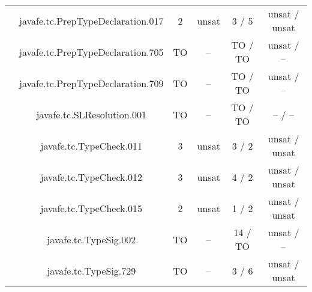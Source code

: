 \begin{table}[htbp]
\begin{minipage}{0.60\textwidth}
{\begin{tabular}[c]{c c!{\vrule width 1.5pt}c|c!{\vrule width 1.5pt}c|c|}
 			& javafe.tc.PrepTypeDeclaration.017	   		     & 2    & unsat   & 3   / 5        & unsat / unsat     \\
		 	& javafe.tc.PrepTypeDeclaration.705    			     & TO   & --      & TO  / TO       & unsat / --        \\
		 	& javafe.tc.PrepTypeDeclaration.709    			     & TO   & --      & TO  / TO       & unsat / --        \\
 			& javafe.tc.SLResolution.001		   		     & TO   & --      & TO  / TO       & --    / --        \\
 			& javafe.tc.TypeCheck.011		   		     & 3    & unsat   & 3   / 2        & unsat / unsat     \\
 			& javafe.tc.TypeCheck.012		   		     & 3    & unsat   & 4   / 2        & unsat / unsat     \\
 			& javafe.tc.TypeCheck.015		   		     & 2    & unsat   & 1   / 2        & unsat / unsat     \\
		 	& javafe.tc.TypeSig.002		    			     & TO   & --      & 14  / TO       & unsat / --        \\
		 	& javafe.tc.TypeSig.729		    			     & TO   & --      & 3   / 6        & unsat / unsat     \\

\end{tabular}}
\end{minipage}
\end{table}
